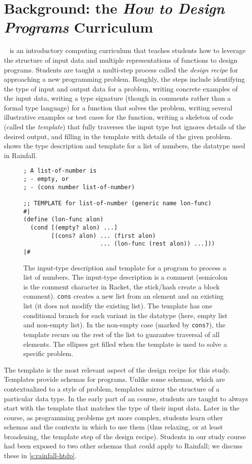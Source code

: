 \section{Background: the \emph{How to Design Programs} Curriculum}

\htdp~\cite{fffk:htdp} is an introductory computing curriculum that teaches students
how to leverage the structure of input data and multiple
representations of functions to design programs.  Students are taught
a multi-step process called the \emph{design recipe} for approaching a
new programming problem.  Roughly, the steps include identifying the
type of input and output data for a problem, writing concrete examples
of the input data, writing a type signature (though in comments rather
than a formal type language) for a function that solves the problem,
writing several illustrative examples or test cases for the function,
writing a skeleton of code  (called
the \emph{template}) that fully traverses the input type but ignores
details of the desired output, and
filling in the template with details of the given
problem.  shows the type description and
template for a list of numbers, the datatype used in Rainfall.

\begin{figure}
\begin{lstlisting}
; A list-of-number is
; - empty, or
; - (cons number list-of-number)

;; TEMPLATE for list-of-number (generic name lon-func)
#|
(define (lon-func alon)
  (cond [(empty? alon) ...]
        [(cons? alon) ... (first alon)
                      ... (lon-func (rest alon)) ...]))
|#
\end{lstlisting}
\caption{The \htdp input-type description and template for a program
  to process a list of numbers. The input-type description is a
  comment (semicolon is the comment character in Racket, the
  stick/hash create a block comment). \lstinline{cons}
  creates a new list from an element and an existing list (it
  does not modify the existing list). The template has one conditional
  branch for each variant in the datatype (here, empty list and
  non-empty list).  In the non-empty case (marked by
  \lstinline{cons?}), the template recurs on the rest of the list to
  guarantee traversal of all elements.  The ellipses
  get filled when the template is used to solve a specific
  problem.  }
\label{f:htdp-template}
\end{figure}

The template is the most relevant aspect of the design recipe for this
study.  Templates provide schemas for programs.  Unlike some schemas,
which are contextualized to a style of problem, templates mirror the
structure of a particular data type. In the early part of an \htdp course,
students are taught to always start with the template that matches the
type of their input data. Later in the course, as programming problems
get more complex, students learn other schemas and the contexts in
which to use them (thus relaxing, or at least broadening, the template
step of the design recipe). Students in our study course had been
exposed to two other schemas that could apply to Rainfall; we discuss
these in \cref{s:rainfall-htdp}.


